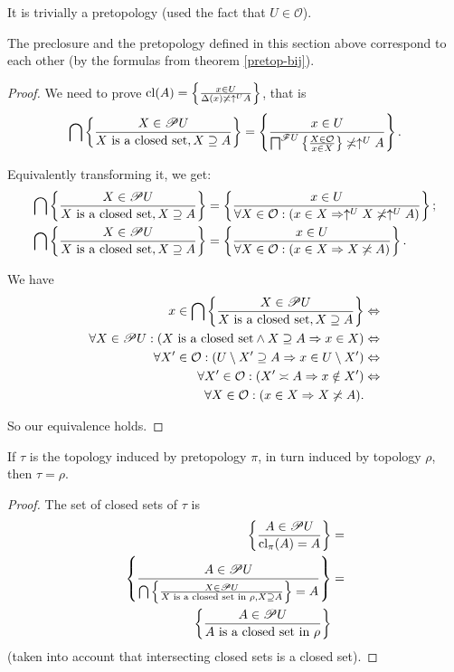 It is trivially a pretopology (used the fact that $U\in\mathcal{O}$).
\begin{prop}
The preclosure and the pretopology defined in this section above correspond
to each other (by the formulas from theorem \ref{pretop-bij}).\end{prop}
\begin{proof}
We need to prove $\operatorname{cl}(A)=\left\{ \frac{x\in U}{\Delta(x)\not\asymp\uparrow^{U}A}\right\}$,
that is
\[
\bigcap\left\{ \frac{X\in\mathscr{P} U}{X\text{ is a closed set},X\supseteq A}\right\}=\left\{ \frac{x\in U}{\bigsqcap^{\mathscr{F}U}\left\{ \frac{X\in\mathcal{O}}{x\in X}\right\}\not\asymp\uparrow^{U}A}\right\}.
\]


Equivalently transforming it, we get:
\begin{align*}
\bigcap\left\{ \frac{X\in\mathscr{P} U}{X\text{ is a closed set},X\supseteq A}\right\} & =\left\{ \frac{x\in U}{\forall X\in\mathcal{O}:(x\in X\Rightarrow\uparrow^{U}X\not\asymp\uparrow^{U}A)}\right\};\\
\bigcap\left\{ \frac{X\in\mathscr{P} U}{X\text{ is a closed set},X\supseteq A}\right\} & =\left\{ \frac{x\in U}{\forall X\in\mathcal{O}:(x\in X\Rightarrow X\not\asymp A)}\right\}.
\end{align*}


We have
\begin{align*}
x\in\bigcap\left\{ \frac{X\in\mathscr{P} U}{X\text{ is a closed set},X\supseteq A}\right\} & \Leftrightarrow\\
\forall X\in\mathscr{P} U:(X\text{ is a closed set}\land X\supseteq A\Rightarrow x\in X) & \Leftrightarrow\\
\forall X'\in\mathcal{O}:(U\setminus X'\supseteq A\Rightarrow x\in U\setminus X') & \Leftrightarrow\\
\forall X'\in\mathcal{O}:(X'\asymp A\Rightarrow x\notin X') & \Leftrightarrow\\
\forall X\in\mathcal{O}:(x\in X\Rightarrow X\not\asymp A).
\end{align*}


So our equivalence holds.\end{proof}
\begin{prop}
If $\tau$ is the topology induced by pretopology $\pi$, in turn
induced by topology $\rho$, then $\tau=\rho$.\end{prop}
\begin{proof}
The set of closed sets of $\tau$ is
\begin{align*}
\left\{ \frac{A\in\mathscr{P} U}{\operatorname{cl}_{\pi}(A)=A}\right\} & =\\
\left\{ \frac{A\in\mathscr{P} U}{\bigcap\left\{ \frac{X\in\mathscr{P} U}{X\text{ is a closed set in }\rho,X\supseteq A}\right\}=A}\right\} & =\\
\left\{ \frac{A\in\mathscr{P} U}{A\text{ is a closed set in }\rho}\right\}
\end{align*}
(taken into account that intersecting closed sets is a closed set).\end{proof}
